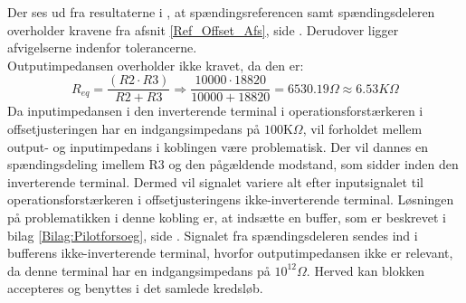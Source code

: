 \noindent Der ses ud fra resultaterne i , at spændingsreferencen samt spændingsdeleren overholder kravene fra afsnit \ref{Ref_Offset_Afs}, side \pageref{Ref_Offset_Afs}. Derudover ligger afvigelserne indenfor tolerancerne. \\
Outputimpedansen overholder ikke kravet, da den er:
\begin{equation}
R_{eq} = \dfrac{(R2 \cdot R3)}{R2 + R3} \Longrightarrow \dfrac{10000 \cdot 18820}{10000 + 18820} = 6530.19\Omega \approx 6.53K\Omega
\end{equation}
\noindent Da inputimpedansen i den inverterende terminal i operationsforstærkeren i offsetjusteringen har en indgangsimpedans på $100$K$\Omega$, vil forholdet mellem output- og inputimpedans i koblingen være problematisk. Der vil dannes en spændingsdeling imellem R$3$ og den pågældende modstand, som sidder inden den inverterende terminal. Dermed vil signalet variere alt efter inputsignalet til operationsforstærkeren i offsetjusteringens ikke-inverterende terminal. Løsningen på problematikken i denne kobling er, at indsætte en buffer, som er beskrevet i bilag \ref{Bilag:Pilotforsoeg}, side \pageref{Bilag:Pilotforsoeg}. \cite{Schaumann2014} Signalet fra spændingsdeleren sendes ind i bufferens ikke-inverterende terminal, hvorfor outputimpedansen ikke er relevant, da denne terminal har en indgangsimpedans på $10^{12}\Omega$. Herved kan blokken accepteres og benyttes i det samlede kredsløb.
